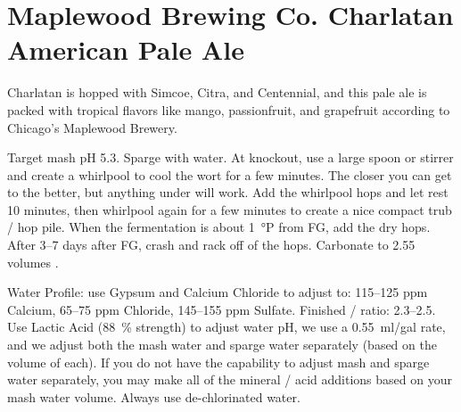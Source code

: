 \documentclass[10pt,oneside]{scrbook}
\begin{document}
\chapter*{Maplewood Brewing Co. Charlatan American Pale Ale}

\begin{aboutblock}
Charlatan is hopped with Simcoe, Citra, and Centennial, and this pale ale is packed with
tropical flavors like mango, passionfruit, and grapefruit according to Chicago's Maplewood
Brewery.
\end{aboutblock}


\begin{methodandtiming}
 
\begin{mashsteps}
\end{mashsteps}

\begin{directions}
Target mash pH 5.3. Sparge with  water. At knockout, use a large spoon or stirrer
and create a whirlpool to cool the wort for a few minutes. The closer you can get to 
the better, but anything under  will work. Add the whirlpool hops and let rest 10
minutes, then whirlpool again for a few minutes to create a nice compact trub / hop pile.
When the fermentation is about 1~°P from FG, add the dry hops. After 3--7 days after FG, crash
and rack off of the hops. Carbonate to 2.55 volumes .

Water Profile: use Gypsum and Calcium Chloride to adjust to: 115--125 ppm Calcium,
65--75 ppm Chloride, 145--155 ppm Sulfate. Finished / ratio: 2.3--2.5.
Use Lactic Acid (88~\% strength) to adjust water pH, we use a 0.55~ml/gal rate, and we
adjust both the mash water and sparge water separately (based on the volume of each).
If you do not have the capability to adjust mash and sparge water separately, you may
make all of the mineral / acid additions based on your mash water volume. Always use
de-chlorinated water.
\end{directions}

\end{methodandtiming}

\pagebreak
\end{document}
